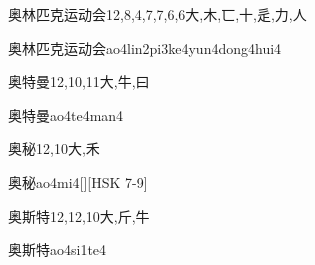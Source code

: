 \begin{Entry}{奥林匹克运动会}{12,8,4,7,7,6,6}{⼤,⽊,⼖,⼗,⾡,⼒,⼈}
  \begin{Phonetics}{奥林匹克运动会}{ao4lin2pi3ke4yun4dong4hui4}
  \end{Phonetics}
\end{Entry}

\begin{Entry}{奥特曼}{12,10,11}{⼤,⽜,⽈}
  \begin{Phonetics}{奥特曼}{ao4te4man4}
  \end{Phonetics}
\end{Entry}

\begin{Entry}{奥秘}{12,10}{⼤,⽲}
  \begin{Phonetics}{奥秘}{ao4mi4}[][HSK 7-9]
  \end{Phonetics}
\end{Entry}

\begin{Entry}{奥斯特}{12,12,10}{⼤,⽄,⽜}
  \begin{Phonetics}{奥斯特}{ao4si1te4}
  \end{Phonetics}
\end{Entry}


